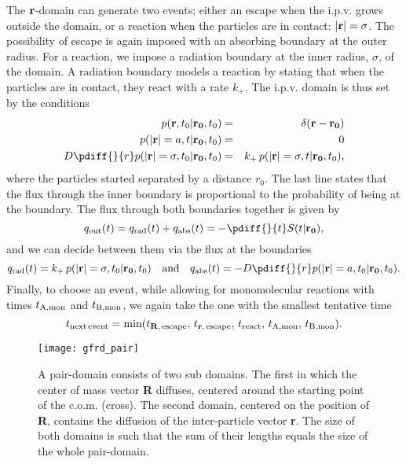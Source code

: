 The ${\bf r}$-domain can generate two events; either an escape when the i.p.v. grows outside the domain, or a reaction when the particles are in contact: $|{\bf r}|=\sigma$. The possibility of escape is again imposed with an absorbing boundary at the outer radius. For a reaction, we impose a radiation boundary at the inner radius, $\sigma$, of the domain. A radiation boundary models a reaction by stating that when the particles are in contact, they react with a rate $k_+$. The i.p.v. domain is thus set by the conditions
\setlength{\jot}{10pt}
\begin{eqnarray}
 p({\bf r}, t_0|{\bf r_0},t_0) & = & \delta(\mathbf{r - r_0}) \\
 p({\bf |r|}=a, t|{\bf r_0},t_0) & = & 0 \\
 D \pdiff{}{r} p({\bf |r|}=\sigma, t_0|{\bf r_0},t_0) & = & k_+\,p({\bf |r|}=\sigma, t|{\bf r_0},t_0),
\end{eqnarray}
where the particles started separated by a distance $r_0$. The last line states that the flux through the inner boundary is proportional to the probability of being at the boundary. The flux through both boundaries together is given by
\begin{equation}
 q_{\rm out}(t) = q_{\rm rad}(t) + q_{\rm abs}(t) = -\pdiff{}{t} S(t|{\bf r_0}),
\end{equation}
and we can decide between them via the flux at the boundaries
\begin{equation}
q_{\rm rad}(t) = k_+ \, p({\bf |r|}=\sigma, t_0|{\bf r_0},t_0) \quad{\rm and}\quad q_{\rm abs}(t) = - D \pdiff{}{r} p({\bf |r|}=a, t_0|{\bf r_0},t_0).
\end{equation}
Finally, to choose an event, while allowing for monomolecular reactions with times $t_{\rm A, mon}$ and $t_{\rm B, mon}$, we again take the one with the smallest tentative time
\begin{equation}
 t_{\rm next\,event} = {\rm min}(t_{{\bf R},\,{\rm escape}},\,t_{{\bf r},\,{\rm escape}},\,t_{\rm react},\,t_{\rm A, mon},\,t_{\rm B, mon}).
\end{equation}

\begin{figure}[ht]
\centering
\texttt{[image: gfrd\_pair]}
\caption{ A pair-domain consists of two sub domains. The first in which the center of mass vector {\bf R} diffuses, centered around the starting point of the c.o.m. (cross). The second domain, centered on the position of {\bf R}, contains the diffusion of the inter-particle vector {\bf r}. The size of both domains is such that the sum of their lengths equals the size of the whole pair-domain. }
\end{figure}

